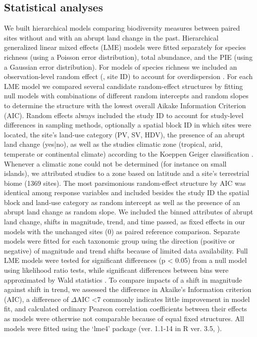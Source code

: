 \subsection{Statistical analyses} 
We built hierarchical models comparing biodiversity measures between paired sites without and with an abrupt land change in the past. Hierarchical generalized linear mixed effects (LME) models were fitted separately for species richness (using a Poisson error distribution), total abundance, and the PIE (using a Gaussian error distribution). For models of species richness we included an observation-level random effect (\ie, site ID) to account for overdispersion  \citep{Harrison2015}. For each LME model we compared several candidate random-effect structures by fitting null models with combinations of different random intercepts and random slopes to determine the structure with the lowest overall Aikake Information Criterion (AIC). Random effects always included the study ID to account for study-level differences in sampling methods, optionally a spatial block ID in which sites were located, the site’s land-use category (PV, SV, HDV), the presence of an abrupt land change (yes|no), as well as the studies climatic zone (tropical, arid, temperate or continental climate) according to the Koeppen Geiger classification \citep{Peel2007}. Whenever a climatic zone could not be determined (for instance on small islands), we attributed studies to a zone based on latitude and a site’s terrestrial biome (1369 sites). The most parsimonious random-effect structure by AIC was identical among response variables and included \textendash besides the study ID \textendash the spatial block and land-use category as random intercept as well as the presence of an abrupt land change as random slope. We included the binned attributes of abrupt land change, \eg shifts in magnitude, trend, and time passed, as fixed effects in our models with the unchanged sites (0) as paired reference comparison. Separate models were fitted for each taxonomic group using the direction (positive or negative) of magnitude and trend shifts because of limited data availability. Full LME models were tested for significant differences (p < 0.05) from a null model using likelihood ratio tests, while significant differences between bins were approximated by Wald statistics \citep{lme4}. To compare impacts of a shift in magnitude against shift in trend, we assessed the difference in Akaike’s Information criterion (AIC), a difference of $\Delta$AIC <7 commonly indicates little improvement in model fit, and calculated ordinary Pearson correlation coefficients between their effects as models were otherwise not comparable because of equal fixed structures. All models were fitted using the ‘lme4’ package (ver. 1.1-14 in R ver. 3.5, \cite{lme4,RTeam2014}). 


